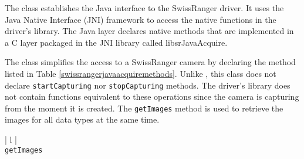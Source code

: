 The \SwissRangerJavaAcquire{} class establishes the Java interface to the SwissRanger driver. It uses the 
Java Native Interface (JNI) framework to access the native functions in the driver's library. The \RD{} Java layer 
declares native methods that are implemented in a C layer packaged in the \RD{} JNI library called 
libsrJavaAcquire. 

The \SwissRangerJavaAcquire{} class simplifies the access to a SwissRanger camera by declaring the 
method listed in Table \ref{swissrangerjavaacquiremethods}. Unlike \DCJavaAcquire{}, this class does not
declare \texttt{start\-Cap\-tur\-ing} nor \texttt{stop\-Cap\-tur\-ing} methods. The driver's library does not contain
functions equivalent to these operations since the camera is capturing from the moment it is created.
The \texttt{getImages} method is used to retrieve the images for all data types at the same time.  

\begin{table}[ht]
\caption{Public methods in the \SwissRangerJavaAcquire{} class}
\begin{center}
\begin{tabular}{| l |}
	\hline 
	 \\
	\hline \hline
	\texttt{getImages} \\
	\hline
\end{tabular}
\end{center}
\label{swissrangerjavaacquiremethods}
\end{table}
